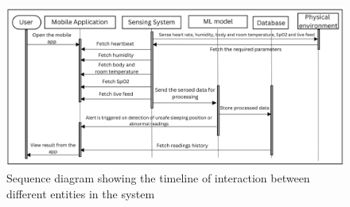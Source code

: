 \documentclass[12pt,a4paper]{report}
\begin{document}
\begin{figure}[hbtp]
  \centering
  \includegraphics[scale=0.27]{./pic/seq.png}
  \caption{Sequence diagram showing the timeline of interaction between different entities in the system}
  \label{fig:sequence}
\end{figure}

\end{document}
